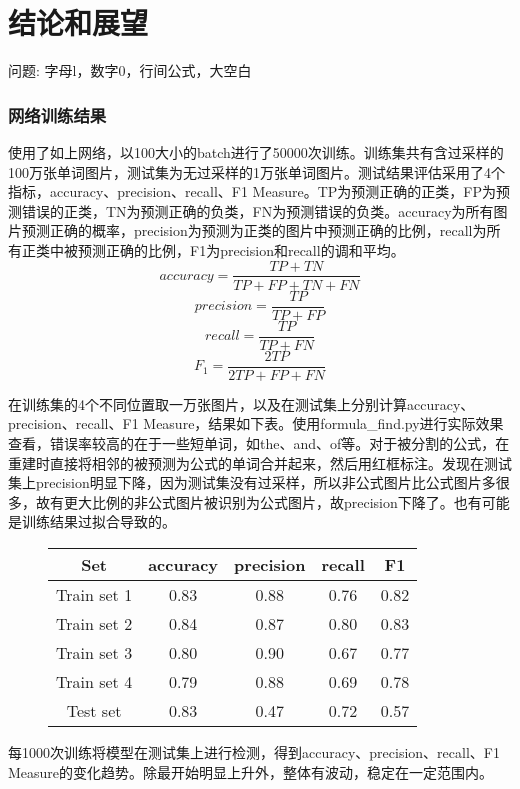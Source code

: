 

\chapter{结论和展望}

问题: 字母l，数字0，行间公式，大空白


\subsection{网络训练结果}
\noindent

使用了如上网络，以100大小的batch进行了50000次训练。训练集共有含过采样的100万张单词图片，测试集为无过采样的1万张单词图片。测试结果评估采用了4个指标，accuracy、precision、recall、F1 Measure。TP为预测正确的正类，FP为预测错误的正类，TN为预测正确的负类，FN为预测错误的负类。accuracy为所有图片预测正确的概率，precision为预测为正类的图片中预测正确的比例，recall为所有正类中被预测正确的比例，F1为precision和recall的调和平均。
\[accuracy = \frac {TP + TN} {TP + FP + TN + FN}\]
\[precision = \frac {TP} {TP + FP}\]
\[recall = \frac {TP} {TP + FN}\]
\[F_1 = \frac {2 TP } {2 TP + FP + FN}\]



在训练集的4个不同位置取一万张图片，以及在测试集上分别计算accuracy、precision、recall、F1 Measure，结果如下表。使用formula\_find.py进行实际效果查看，错误率较高的在于一些短单词，如the、and、of等。对于被分割的公式，在重建时直接将相邻的被预测为公式的单词合并起来，然后用红框标注。发现在测试集上precision明显下降，因为测试集没有过采样，所以非公式图片比公式图片多很多，故有更大比例的非公式图片被识别为公式图片，故precision下降了。也有可能是训练结果过拟合导致的。

\begin{figure}[hp]
\centering
\begin{tabular}{ccccc}
\toprule
Set& accuracy& precision& recall& F1\\
\midrule
Train set 1& 0.83& 0.88& 0.76& 0.82\\
Train set 2& 0.84& 0.87& 0.80& 0.83\\
Train set 3& 0.80& 0.90& 0.67& 0.77\\
Train set 4& 0.79& 0.88& 0.69& 0.78\\
Test set& 0.83& 0.47& 0.72& 0.57\\
\bottomrule
\end{tabular}
\end{figure}

每1000次训练将模型在测试集上进行检测，得到accuracy、precision、recall、F1 Measure的变化趋势。除最开始明显上升外，整体有波动，稳定在一定范围内。

